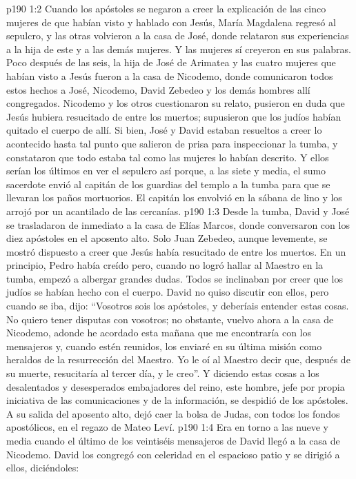 \vs p190 1:2 Cuando los apóstoles se negaron a creer la explicación de las cinco mujeres de que habían visto y hablado con Jesús, María Magdalena regresó al sepulcro, y las otras volvieron a la casa de José, donde relataron sus experiencias a la hija de este y a las demás mujeres. Y las mujeres sí creyeron en sus palabras. Poco después de las seis, la hija de José de Arimatea y las cuatro mujeres que habían visto a Jesús fueron a la casa de Nicodemo, donde comunicaron todos estos hechos a José, Nicodemo, David Zebedeo y los demás hombres allí congregados. Nicodemo y los otros cuestionaron su relato, pusieron en duda que Jesús hubiera resucitado de entre los muertos; supusieron que los judíos habían quitado el cuerpo de allí. Si bien, José y David estaban resueltos a creer lo acontecido hasta tal punto que salieron de prisa para inspeccionar la tumba, y constataron que todo estaba tal como las mujeres lo habían descrito. Y ellos serían los últimos en ver el sepulcro así porque, a las siete y media, el sumo sacerdote envió al capitán de los guardias del templo a la tumba para que se llevaran los paños mortuorios. El capitán los envolvió en la sábana de lino y los arrojó por un acantilado de las cercanías.
\vs p190 1:3 Desde la tumba, David y José se trasladaron de inmediato a la casa de Elías Marcos, donde conversaron con los diez apóstoles en el aposento alto. Solo Juan Zebedeo, aunque levemente, se mostró dispuesto a creer que Jesús había resucitado de entre los muertos. En un principio, Pedro había creído pero, cuando no logró hallar al Maestro en la tumba, empezó a albergar grandes dudas. Todos se inclinaban por creer que los judíos se habían hecho con el cuerpo. David no quiso discutir con ellos, pero cuando se iba, dijo: “Vosotros sois los apóstoles, y deberíais entender estas cosas. No quiero tener disputas con vosotros; no obstante, vuelvo ahora a la casa de Nicodemo, adonde he acordado esta mañana que me encontraría con los mensajeros y, cuando estén reunidos, los enviaré en su última misión como heraldos de la resurrección del Maestro. Yo le oí al Maestro decir que, después de su muerte, resucitaría al tercer día, y le creo”. Y diciendo estas cosas a los desalentados y desesperados embajadores del reino, este hombre, jefe por propia iniciativa de las comunicaciones y de la información, se despidió de los apóstoles. A su salida del aposento alto, dejó caer la bolsa de Judas, con todos los fondos apostólicos, en el regazo de Mateo Leví.
\vs p190 1:4 Era en torno a las nueve y media cuando el último de los veintiséis mensajeros de David llegó a la casa de Nicodemo. David los congregó con celeridad en el espacioso patio y se dirigió a ellos, diciéndoles:
